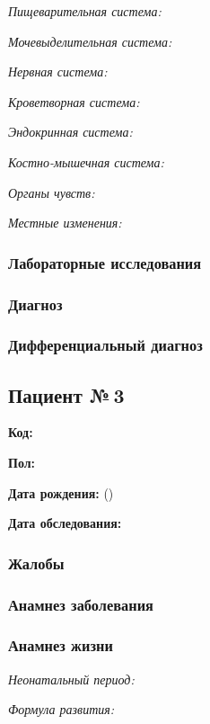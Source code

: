 \documentclass[a4paper,14pt]{extarticle}
\begin{document}
\emph{Пищеварительная система:}

\emph{Мочевыделительная система:}

\emph{Нервная система:} 

\emph{Кроветворная система:}

\emph{Эндокринная система:}

\emph{Костно-мышечная система:}

\emph{Органы чувств:}

\emph{Местные изменения:}

\subsubsection*{Лабораторные исследования}

\subsubsection*{Диагноз}

\subsubsection*{Дифференциальный диагноз}

\newpage
\subsection*{Пациент №\,3}

\textbf{Код:} 

\textbf{Пол:}

\textbf{Дата рождения:}  ()

\textbf{Дата обследования:} 

\subsubsection*{Жалобы}

\subsubsection*{Анамнез заболевания}

\subsubsection*{Анамнез жизни}

\emph{Неонатальный период:}

\emph{Формула развития:}
\end{document}

